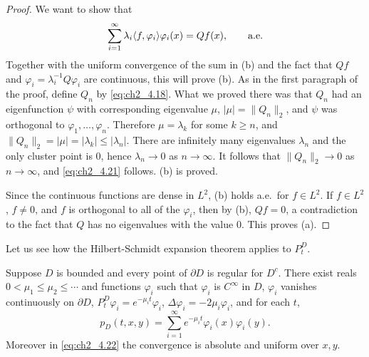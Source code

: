 \begin{proof}
We want to show that
\begin{equation}\label{eq:ch2_4.21}
    \sum_{i=1}^{\infty} \lambda_i\langle f, \varphi_i \rangle\varphi_i(x) = Qf(x), \qquad \text{a.e.}
\end{equation}
Together with the uniform convergence of the sum in (b) and the fact that $Qf$ and $\varphi_i = \lambda_i^{-1}Q\varphi_i$ are continuous, this will prove (b). As in the first paragraph of the proof, define $Q_n$ by \eqref{eq:ch2_4.18}. What we proved there was that $Q_n$ had an eigenfunction $\psi$ with corresponding eigenvalue $\mu$, $|\mu| = \|Q_n\|_2$, and $\psi$ was orthogonal to $\varphi_1,\ldots,\varphi_n$. Therefore $\mu = \lambda_k$ for some $k \geq n$, and $\|Q_n\|_2 = |\mu| = |\lambda_k| \leq |\lambda_n|$. There are infinitely many eigenvalues $\lambda_n$ and the only cluster point is $0$, hence $\lambda_n \to 0$ as $n \to \infty$. It follows that $\|Q_n\|_2 \to 0$ as $n \to \infty$, and \eqref{eq:ch2_4.21} follows. (b) is proved.

Since the continuous functions are dense in $L^2$, (b) holds a.e.\ for $f \in L^2$. If $f \in L^2$, $f \neq 0$, and $f$ is orthogonal to all of the $\varphi_i$, then by (b), $Qf = 0$, a contradiction to the fact that $Q$ has no eigenvalues with the value $0$. This proves (a).
\end{proof}



Let us see how the Hilbert-Schmidt expansion theorem applies to $P_t^D$.

\begin{theorem}\label{thm:ch2_4.13}
Suppose $D$ is bounded and every point of $\partial D$ is regular for $D^c$. There exist reals $0 < \mu_1 \leq \mu_2 \leq \cdots$ and functions $\varphi_i$ such that $\varphi_i$ is $C^\infty$ in $D$, $\varphi_i$ vanishes continuously on $\partial D$, $P_t^D\varphi_i = e^{-\mu_it}\varphi_i$, $\Delta\varphi_i = -2\mu_i\varphi_i$,
and for each $t$,
\begin{equation}\label{eq:ch2_4.22}
    p_D(t, x, y) = \sum_{i=1}^{\infty} e^{-\mu_it}\varphi_i(x)\varphi_i(y).
\end{equation}
Moreover in \eqref{eq:ch2_4.22} the convergence is absolute and uniform over $x,y$.
\end{theorem}

